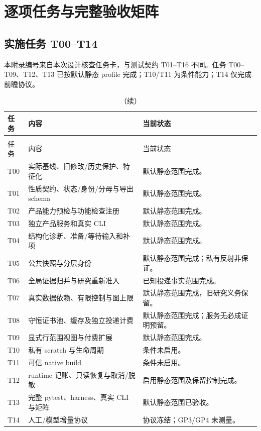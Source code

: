 \section{逐项任务与完整验收矩阵}
\subsection{实施任务 T00--T14}
本附录编号来自本次设计核查任务卡，与测试契约 T01--T16 不同。任务 T00--T09、T12、T13 已按默认静态 profile 完成；T10/T11 为条件能力；T14 仅完成前瞻协议。
\begin{longtable}{L{14mm}L{69mm}L{66mm}}
\caption{任务完成范围；不将条件项或协议冻结视为测量完成。}\\
\toprule 任务 & 内容 & 当前状态\\\midrule\endfirsthead
\caption[]{（续）}\\
\toprule 任务 & 内容 & 当前状态\\\midrule\endhead
T00 & 实际基线、旧修改/历史保护、特征化 & 默认静态范围完成。\\
T01 & 性质契约、状态/身份/分母与导出 schema & 默认静态范围完成。\\
T02 & 产品能力预检与功能检查注册 & 默认静态范围完成。\\
T03 & 独立产品服务和真实 CLI & 默认静态范围完成。\\
T04 & 结构化诊断、准备/等待输入和补项 & 默认静态范围完成。\\
T05 & 公共快照与分层身份 & 默认静态范围完成；私有反射非保证。\\
T06 & 全局证据归并与研究重新准入 & 已知投递事实范围完成。\\
T07 & 真实数据依赖、有限控制与图上限 & 默认静态范围完成，旧研究义务保留。\\
T08 & 守恒证书池、缓存及独立投递计费 & 默认静态范围完成；服务无必成证明预留。\\
T09 & 显式行范围视图与付费扩展 & 默认静态范围完成。\\
T10 & 私有 scratch 与生命周期 & 条件未启用。\\
T11 & 可信 native build & 条件未启用。\\
T12 & runtime 记账、只读恢复与取消/脱敏 & 启用静态范围及保留控制完成。\\
T13 & 完整 pytest、harness、真实 CLI 与矩阵 & 默认静态范围已验收。\\
T14 & 人工/模型增量协议 & 协议冻结；GP3/GP4 未测量。\\
\bottomrule\end{longtable}

